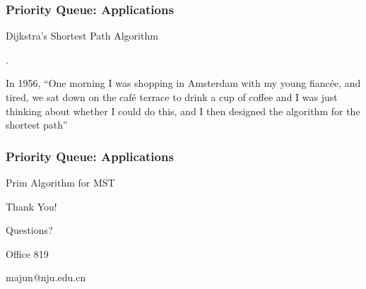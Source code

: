 \documentclass[UTF8,11pt]{beamer}
\begin{document}
\begin{frame}[t]
\frametitle{Priority Queue: Applications}
\begin{block}{Dijkstra's Shortest Path Algorithm}
	\begin{center}
	\end{center}
	\footnotesize{.
		
		In 1956, ``One morning I was shopping in Amsterdam with my young fiancée, and tired, we sat down on the café terrace to drink a cup of coffee and I was just thinking about whether I could do this, and I then designed the algorithm for the shortest path''}
\end{block}
\end{frame}

\begin{frame}[t]
\frametitle{Priority Queue: Applications}
\begin{block}{Prim Algorithm for MST}
	\begin{center}
	\end{center}
\end{block}
\end{frame}


\begin{frame}
	\begin{block}{
		\begin{center}
		{\huge
			Thank You!
			
			\textcolor[rgb]{1,0,0}	{Questions?}
		}
		\end{center}
	}
	\end{block}
	\begin{block}{}
		\begin{center}
		
			Office 819
			
			majun@nju.edu.cn
		\end{center}
	\end{block}
	\end{frame}
\end{document}
